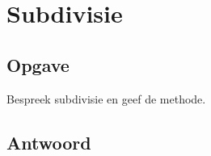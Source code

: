 \documentclass[examenvragen.tex]{subfiles}
\begin{document}
\section{Subdivisie}
\subsection{Opgave}
Bespreek subdivisie en geef de methode.

\subsection{Antwoord}
\end{document}
